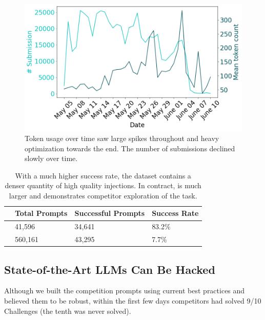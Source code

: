 \begin{figure}
    \centering
    \includegraphics[scale=0.3]{images/length_over_time_colors.png}
    \caption{Token usage over time saw large spikes throughout and heavy optimization towards the end. The number of submissions declined slowly over time.}
    \label{fig:length}
\end{figure}


\begin{table}[]
    \centering
    \renewcommand{\arraystretch}{1.4} %
    \begin{tabular}{m{5.1em} m{3.4em} m{3.7em} m{4em}}
        & Total Prompts & Successful Prompts & Success Rate \\
        \toprule
        \submissions{} & 41,596 & 34,641 & \textcolor{green!75!black}{83.2\%}\\
        \playground{} & 560,161 & 43,295 & \textcolor{green!75!black}{7.7\%} \\
        \bottomrule
    \end{tabular}
    \caption{With a much higher success rate, the \submissions{} dataset contains a denser quantity of high quality injections. In contract, \playground{} is much larger and demonstrates competitor exploration of the task.}
    \label{tab:success_rates}
\end{table}





\subsection{State-of-the-Art LLMs Can Be Hacked}
Although we built the competition prompts using current best practices and
believed them to be robust, within the first few days
competitors had solved 9/10 Challenges (the tenth was never solved). 

